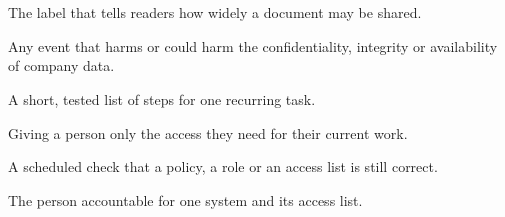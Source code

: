\clearpage
\section*{\lblGlossary}
\begin{termlist}
  \item[Classification] The label that tells readers how widely a document may be shared.
  \item[Incident] Any event that harms or could harm the confidentiality, integrity or availability of company data.
  \item[Runbook] A short, tested list of steps for one recurring task.
  \item[Least privilege] Giving a person only the access they need for their current work.
  \item[Review] A scheduled check that a policy, a role or an access list is still correct.
  \item[System owner] The person accountable for one system and its access list.
\end{termlist}
